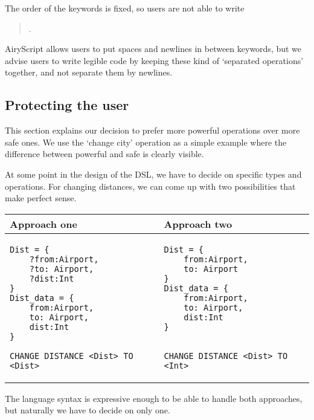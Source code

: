 The order of the keywords is fixed, so users are not able to write
\begin{quote}
  .
\end{quote}

AiryScript allows users to put spaces and newlines in between keywords, but we
advise users to write legible code by keeping these kind of ‘separated
operations’ together, and not separate them by newlines.






%
%

\subsection{Protecting the user}
\label{sec:protecting}
This section explains our decision to prefer more powerful operations over more
safe ones. We use the ‘change city’ operation as a simple example where the
difference between powerful and safe is clearly visible.

At some point in the design of the DSL, we have to decide on specific types and
operations. For changing distances, we can come up with two possibilities that
make perfect sense.

\begin{center}
\begin{tabular}{p{}p{}}
  Approach one & Approach two \\\hline
  \begin{lstlisting}
Dist = {
    ?from:Airport,
    ?to: Airport,
    ?dist:Int
}
Dist_data = {
    from:Airport,
    to: Airport,
    dist:Int
}

CHANGE DISTANCE <Dist> TO <Dist>
  \end{lstlisting} &
  \begin{lstlisting}
Dist = {
    from:Airport,
    to: Airport
}
Dist_data = {
    from:Airport,
    to: Airport,
    dist:Int
}


CHANGE DISTANCE <Dist> TO <Int>
  \end{lstlisting}
\end{tabular}
\end{center}
The language syntax is expressive enough to be able to handle both approaches,
but naturally we have to decide on only one.

